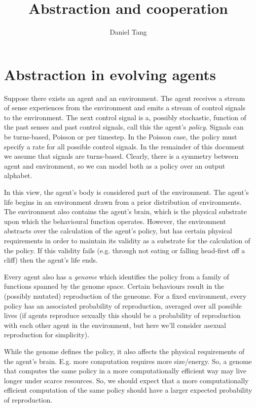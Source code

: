 \documentclass[a4paper]{article}
\title{Abstraction and cooperation}
\author{Daniel Tang}
\begin{document}
\maketitle

\section{Abstraction in evolving agents}

Suppose there exists an agent and an environment. The agent receives a stream of sense experiences from the environment and emits a stream of control signals to the environment. The next control signal is a, possibly stochastic, function of the past senses and past control signals, call this the agent's \textit{policy}. Signals can be turns-based, Poisson or per timestep. In the Poisson case, the policy must specify a rate for all possible control signals. In the remainder of this document we assume that signals are turns-based. Clearly, there is a symmetry between agent and environment, so we can model both as a policy over an output alphabet.

In this view, the agent's body is considered part of the environment. The agent's life begins in an environment drawn from a prior distribution of environments. The environment also contains the agent's brain, which is the physical substrate upon which the behavioural function operates. However, the environment abstracts over the calculation of the agent's policy, but has certain physical requirements in order to maintain its validity as a substrate for the calculation of the policy. If this validity fails (e.g. through not eating or falling head-first off a cliff) then the agent's life ends. 

Every agent also has a \textit{genome} which identifies the policy from a family of functions spanned by the genome space. Certain behaviours result in the (possibly mutated) reproduction of the geneome. For a fixed environment, every policy has an associated probability of reproduction, averaged over all possible lives (if agents reproduce sexually this should be a probability of reproduction with each other agent in the environment, but here we'll consider asexual reproduction for simplicity).

While the genome defines the policy, it also affects the physical requirements of the agent's brain. E.g. more computation requires more size/energy. So, a genome that computes the same policy in a more computationally efficient way may live longer under scarce resources. So, we should expect that a more computationally efficient computation of the same policy should have a larger expected probability of reproduction.
\end{document}
